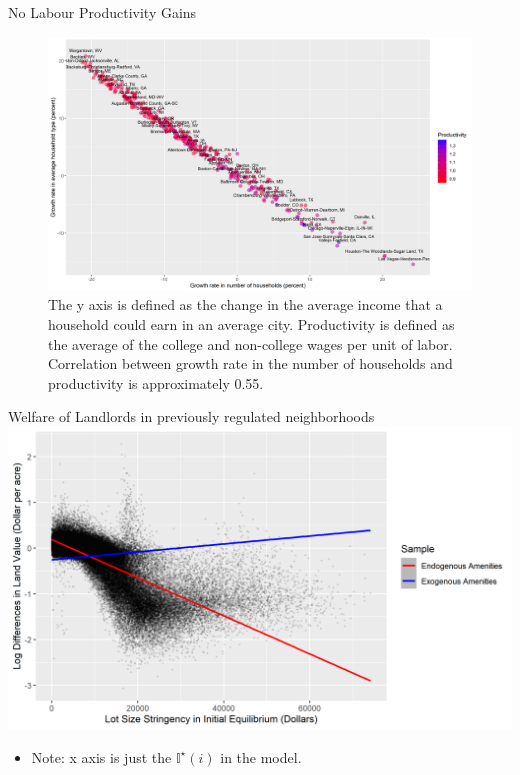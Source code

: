 \documentclass{beamer}
\begin{document}
\begin{frame}{No Labour Productivity Gains}
	\pause
	\begin{figure}[htbp]
	\centering
	
	\includegraphics[width=\textwidth]{IncomeSortingMovement.png}
	
	\caption*{\scriptsize The y axis is defined as the change in the average income that a household could earn in an average city. Productivity is defined as the average of the college and non-college wages per unit of labor. Correlation between growth rate in the number of households and productivity is approximately 0.55.}
	
\end{figure}
\end{frame}

\begin{frame}{Welfare of Landlords in previously regulated neighborhoods}
	\pause
	\includegraphics[width = \textwidth]{StringencyChangeLandVal.png}
	\begin{itemize}
		\item Note: x axis is just the $\mathbb{I}^{\star}(i)$ in the model. 
	\end{itemize}
\end{frame}
\end{document}
